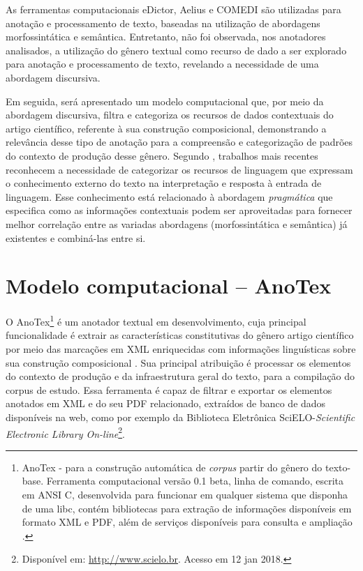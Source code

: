 \documentclass[portuguese]{textolivre}
\begin{document}
As ferramentas computacionais eDictor, Aelius e COMEDI são utilizadas para anotação e processamento de texto, baseadas na utilização de abordagens morfossintática e semântica. Entretanto, não foi observada, nos anotadores analisados, a utilização do gênero textual como recurso de dado a ser explorado para anotação e processamento de texto, revelando a necessidade de uma abordagem discursiva.

Em seguida, será apresentado um modelo computacional que, por meio da abordagem discursiva, filtra e categoriza os recursos de dados contextuais do artigo científico, referente à sua construção composicional, demonstrando a relevância desse tipo de anotação para a compreensão e categorização de padrões do contexto de produção desse gênero. Segundo \textcite{cambria_jumping_2014}, trabalhos mais recentes reconhecem a necessidade de categorizar os recursos de linguagem que expressam o conhecimento externo do texto na interpretação e resposta à entrada de linguagem. Esse conhecimento está relacionado à abordagem \textit{pragmática} que especifica como as informações contextuais podem ser aproveitadas para fornecer melhor correlação entre as variadas abordagens (morfossintática e semântica) já existentes e combiná-las entre si.

\section{Modelo computacional – AnoTex}\label{sec-secoes}
O AnoTex\footnote{AnoTex - para a construção automática de \textit{corpus} partir do gênero do texto-base. Ferramenta computacional versão 0.1 beta, linha de comando, escrita em ANSI C, desenvolvida para funcionar em qualquer sistema que disponha de uma libc, contém bibliotecas para extração de informações disponíveis em formato XML e PDF, além de serviços disponíveis para consulta e ampliação \cite{fonseca_2018}.} é um anotador textual em desenvolvimento, cuja principal funcionalidade é extrair as características constitutivas do gênero artigo científico por meio das marcações em XML enriquecidas com informações linguísticas sobre sua construção composicional \cite{fonseca_etal_2018}. Sua principal atribuição é processar os elementos do contexto de produção e da infraestrutura geral do texto, para a compilação do corpus de estudo. Essa ferramenta é capaz de filtrar e exportar os elementos anotados em XML e do seu PDF relacionado, extraídos de banco de dados disponíveis na web, como por exemplo da Biblioteca Eletrônica SciELO-\textit{Scientific Electronic Library On-line}\footnote{Disponível em: \url{http://www.scielo.br}. Acesso em 12 jan 2018.}.
\end{document}
